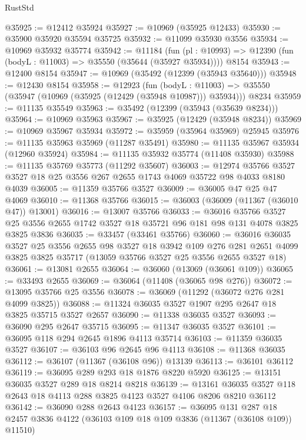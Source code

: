 \begin{lexlean}{RustStd}
\begin{coremodule}
@35925 := @12412 @35924
@35927 := @10969 (@35925 @12433)
@35930 := @35900 @35920 @35594 @35725
@35932 := @11099 @35930 @3556
@35934 := @10969 @35932 @35774
@35942 := @11184
    (fun (pl : @10993) => @12390 (fun (bodyL : @11003) => @35550 (@35644 (@35927 @35934))))
    @8154
@35943 := @12400 @8154
@35947 := @10969 (@35492 (@12399 (@35943 @35640)))
@35948 := @12430 @8154
@35958 := @12923
    (fun (bodyL : @11003) => @35550 (@35947 (@10969 (@35925 (@12429 (@35948 @10987))) @35934)))
    @8234
@35959 := @11135 @35549
@35963 := @35492 (@12399 (@35943 (@35639 @8234)))
@35964 := @10969 @35963
@35967 := @35925 (@12429 (@35948 @8234))
@35969 := @10969 @35967 @35934
@35972 := @35959 (@35964 @35969) @25945
@35976 := @11135 @35963 @35969 (@11287 @35491)
@35980 := @11135 @35967 @35934 (@12960 @35924)
@35984 := @11135 @35932 @35774 (@11408 @35930)
@35988 := @11135 @35769 @35773 (@11292 @35607)
@36003 := @12974
    @35766
    @3527
    @3527
    @18
    @25
    @3556
    @267
    @2655
    @1743
    @4069
    @35722
    @98
    @4033
    @8180
    @4039
@36005 := @11359 @35766 @3527
@36009 := @36005 @47 @25 @47 @4069
@36010 := @11368 @35766
@36015 := @36003 (@36009 (@11367 (@36010 @47)) @13001)
@36016 := @13007 @35766
@36033 := @36016
    @35766
    @3527
    @25
    @3556
    @2655
    @1742
    @3527
    @18
    @35721
    @96
    @181
    @98
    @131
    @4078
    @3825
    @3825
    @3836
@36035 := @33457 (@33461 @35766)
@36060 := @36016
    @36035
    @3527
    @25
    @3556
    @2655
    @98
    @3527
    @18
    @3942
    @109
    @276
    @281
    @2651
    @4099
    @3825
    @3825
    @35717
    (@13059 @35766 @3527 @25 @3556 @2655 @3527 @18)
@36061 := @13081 @2655
@36064 := @36060 (@13069 (@36061 @109))
@36065 := @33493 @2655
@36069 := @36064 (@11408 (@36065 @98 @276))
@36072 := @13095 @35766 @25 @3556
@36078 := @36069 (@11292 (@36072 @276 @281 @4099 @3825))
@36088 := @11324 @36035 @3527 @1907 @295 @2647 @18 @3825 @35715 @3527 @2657
@36090 := @11338 @36035 @3527
@36093 := @36090 @295 @2647 @35715
@36095 := @11347 @36035 @3527
@36101 := @36095 @118 @294 @2645 @1896 @4113 @35714
@36103 := @11359 @36035 @3527
@36107 := @36103 @96 @2645 @96 @4113
@36108 := @11368 @36035
@36112 := @36107 (@11367 (@36108 @96)) @13139
@36113 := @36101 @36112
@36119 := @36095 @289 @293 @18 @1876 @8220 @5920
@36125 := @13151 @36035 @3527 @289 @18 @8214 @8218
@36139 := @13161 @36035 @3527 @118 @2643 @18 @4113 @288 @3825 @4123 @3527 @4106 @8206 @8210 @36112
@36142 := @36090 @288 @2643 @4123
@36157 := @36095
    @131
    @287
    @18
    @2457
    @3836
    @4122
    (@36103 @109 @18 @109 @3836 (@11367 (@36108 @109)) @11510)

\end{coremodule}
\end{lexlean}
